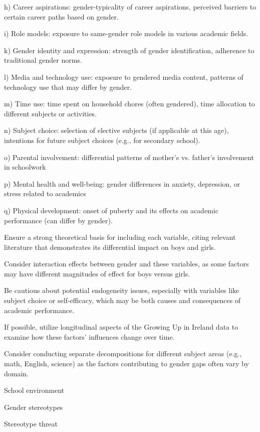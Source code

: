 \documentclass[12pt,a4paper,onecolumn]{article}
\numberwithin{equation}{section}
\begin{document}
h) Career aspirations: gender-typicality of career aspirations, perceived barriers to certain career paths based on gender.

i) Role models: exposure to same-gender role models in various academic fields.

k) Gender identity and expression: strength of gender identification, adherence to traditional gender norms.

l) Media and technology use: exposure to gendered media content, patterns of technology use that may differ by gender. 

m) Time use: time spent on household chores (often gendered), time allocation to different subjects or activities.

n) Subject choice: selection of elective subjects (if applicable at this age), intentions for future subject choices (e.g., for secondary school).

o) Parental involvement: differential patterns of mother's vs. father's involvement in schoolwork

p) Mental health and well-being: gender differences in anxiety, depression, or stress related to academics

q) Physical development: onset of puberty and its effects on academic performance (can differ by gender).

Ensure a strong theoretical basis for including each variable, citing relevant literature that demonstrates its differential impact on boys and girls.

Consider interaction effects between gender and these variables, as some factors may have different magnitudes of effect for boys versus girls.

Be cautious about potential endogeneity issues, especially with variables like subject choice or self-efficacy, which may be both causes and consequences of academic performance.

If possible, utilize longitudinal aspects of the Growing Up in Ireland data to examine how these factors' influences change over time.

Consider conducting separate decompositions for different subject areas (e.g., math, English, science) as the factors contributing to gender gaps often vary by domain.

School environment \textcite{legewie2014}

Gender stereotypes \textcite{cvencek2011,bian2017} 

Stereotype threat \textcite{spencer1999} 
\end{document}
